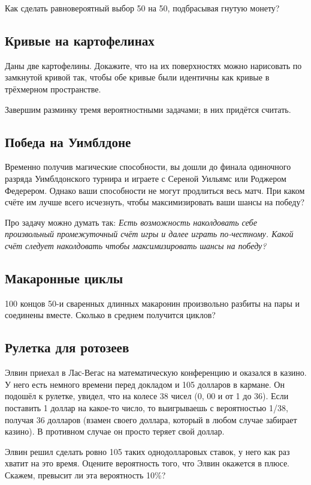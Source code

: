 Как сделать равновероятный выбор 50 на 50, подбрасывая гнутую монету?

\subsection*{Кривые на картофелинах}\label{Кривые на картофелинах}

Даны две картофелины.
Докажите, что на их поверхностях можно нарисовать по замкнутой кривой так, чтобы обе кривые были идентичны как кривые в трёхмерном пространстве.

\medskip

Завершим разминку тремя вероятностными задачами; в них придётся считать.

\subsection*{Победа на Уимблдоне}

Временно получив магические способности, вы дошли до финала одиночного разряда Уимблдонского турнира и играете с Сереной Уильямс или Роджером Федерером.
Однако ваши способности не могут продлиться весь матч.
При каком счёте им лучше всего исчезнуть, чтобы максимизировать ваши шансы на победу?

\begin{addedbytheeditors}
Про задачу можно думать так: 
\textit{Есть возможность наколдовать себе произвольный промежуточный счёт игры и далее играть по-честному.
Какой счёт следует наколдовать чтобы максимизировать шансы на победу?}\pr
\end{addedbytheeditors}



\subsection*{Макаронные циклы}

100 концов 50-и сваренных длинных макаронин произвольно разбиты на пары и соединены вместе.
Сколько в среднем получится циклов?

\subsection*{Рулетка для ротозеев}\label{Рулетка для ротозеев}

Элвин приехал в Лас-Вегас на математическую конференцию и оказался в казино.
У него есть немного времени перед докладом и 105 долларов в кармане.
Он подошёл к рулетке, увидел, что на колесе 38 чисел (0, 00 и от 1 до 36).
Если поставить 1 доллар на какое-то число, то выигрываешь с вероятностью 1/38, получая 36 долларов (взамен своего доллара, который в любом случае забирает казино).
В противном случае он просто теряет свой доллар.

Элвин решил сделать ровно 105 таких однодолларовых ставок, 
у него как раз хватит на это время.
Оцените вероятность того, что Элвин окажется в плюсе.
Скажем, превысит ли эта вероятность 10\%?

